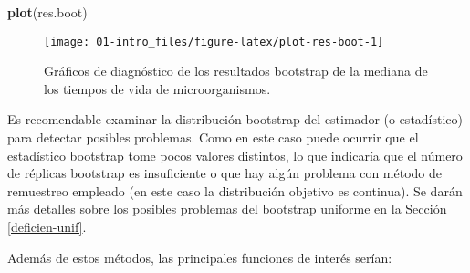 \documentclass[]{book}
\newenvironment{Shaded}{\begin{snugshade}}{\end{snugshade}}
\newcommand{\KeywordTok}[1]{\textcolor[rgb]{0.13,0.29,0.53}{\textbf{#1}}}
\newcommand{\NormalTok}[1]{#1}
\theoremstyle{break}
\theoremstyle{definition}
\theoremstyle{definition}
\theoremstyle{definition}
\theoremstyle{remark}
\begin{document}
\begin{Shaded}
\begin{Highlighting}[]
\KeywordTok{plot}\NormalTok{(res.boot)}
\end{Highlighting}
\end{Shaded}

\begin{figure}[!htb]

{\centering \texttt{[image: 01-intro\_files/figure-latex/plot-res-boot-1]} 

}

\caption{Gráficos de diagnóstico de los resultados bootstrap de la mediana de los tiempos de vida de microorganismos.}\label{fig:plot-res-boot}
\end{figure}

Es recomendable examinar la distribución bootstrap del estimador (o
estadístico) para detectar posibles problemas. Como en este caso puede
ocurrir que el estadístico bootstrap tome pocos valores distintos, lo
que indicaría que el número de réplicas bootstrap es insuficiente o que
hay algún problema con método de remuestreo empleado (en este caso la
distribución objetivo es continua). Se darán más detalles sobre los
posibles problemas del bootstrap uniforme en la Sección
\ref{deficien-unif}.

Además de estos métodos, las principales funciones de interés serían:
\end{document}
